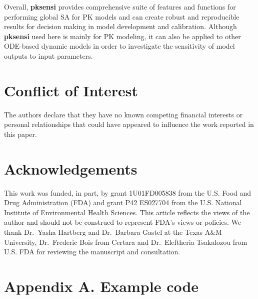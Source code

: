 \documentclass[preprint,12pt, a4paper]{elsarticle}
\begin{document}
Overall, \textbf{pksensi} provides comprehensive suite of features and
functions for performing global SA for PK models and can create robust
and reproducible results for decision making in model development and
calibration. Although \textbf{pksensi} used here is mainly for PK
modeling, it can also be applied to other ODE-based dynamic models in
order to investigate the sensitivity of model outputs to input
parameters.

\section*{Conflict of Interest}

The authors declare that they have no known competing financial interests or personal relationships that could have appeared to influence the work reported in this paper.

\section*{Acknowledgements}

This work was funded, in part, by grant 1U01FD005838 from the U.S. Food
and Drug Administration (FDA) and grant P42 ES027704 from the U.S.
National Institute of Environmental Health Sciences. This article
reflects the views of the author and should not be construed to
represent FDA's views or policies. We thank Dr.~Yasha Hartberg and
Dr.~Barbara Gastel at the Texas A\&M University, Dr.~Frederic Bois from
Certara and Dr.~Eleftheria Tsakalozou from U.S. FDA for reviewing the
manuscript and consultation.


\appendix
\section*{Appendix A. Example code}
\end{document}
